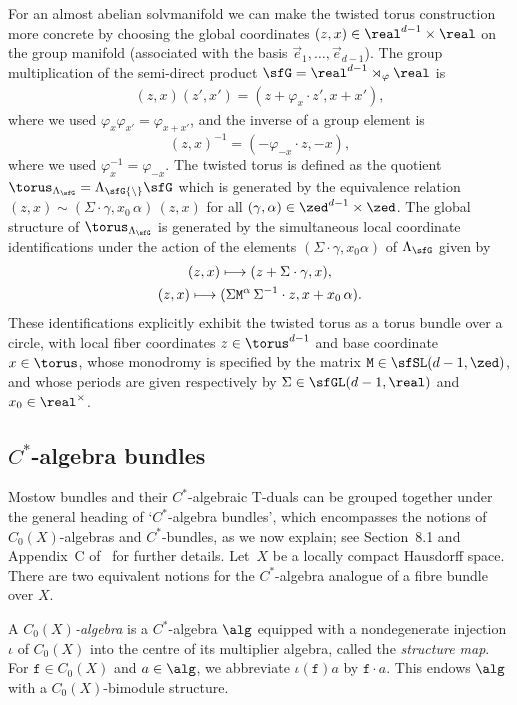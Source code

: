 For an almost abelian solvmanifold we can make the twisted torus construction more concrete
by choosing the global
coordinates $(z,x)\in\real^{d-1}\times\real$ on the group
manifold (associated with the basis $\vec e_1,\ldots,\vec e_{d-1}$).
The group multiplication of the semi-direct product
$\sfG=\real^{d-1}\rtimes_\varphi\real$ is
\begin{gather}\label{eq:grouplaw}
(z,x) (z',x') = (z + \varphi_x\cdot z',x+x') ,
\end{gather}
where we used $\varphi_x \varphi_{x'} = \varphi_{x+x'}$, and the
inverse of a group element is
\[
(z,x)^{-1} = (-\varphi_{-x}\cdot z,-x) ,
\]
where we used $\varphi_x^{-1}=\varphi_{-x}$.
The twisted torus is defined as the quotient $\torus_{\Lambda_\sfG}=\Lambda_\sfG
{\setminus} \sfG$ which is generated by the equivalence relation $(z,x)\sim
(\Sigma\cdot\gamma,x_0\,\alpha)\,(z,x)$ for all $(\gamma,\alpha)\in\zed^{d-1}\times\zed$. The global structure
of $\torus_{\Lambda_{\sfG}}$ is generated by the simultaneous local coordinate
identifications under the action of the elements
$(\Sigma\cdot\gamma,x_0 \alpha) $ of $\Lambda_\sfG$ given by
\begin{gather}
(z,x) \longmapsto (
 z+\Sigma\cdot\gamma,x) , \nonumber \\
(z,x) \longmapsto (
\Sigma {\tt M}^\alpha\,\Sigma^{-1}\cdot z,x+x_0\,\alpha) .\label{eq:Mostowtorus}
\end{gather}
These identifications explicitly exhibit the twisted torus as a torus bundle over a circle, with
local fiber coordinates $z\in \torus^{d-1}$ and base coordinate $x\in \torus$,
 whose monodromy is specified by the matrix ${\tt M}\in
 \sfSL(d-1,\zed)$, and whose periods are given respectively by
 $\Sigma\in\sfGL(d-1,\real)$ and $x_0\in\real^\times$.

\subsection{$C^*$-algebra bundles}\label{sec:C*bundles}

Mostow bundles and their $C^*$-algebraic T-duals can be grouped together
under the general heading of `$C^*$-algebra bundles', which encompasses
the notions of $C_0(X)$-algebras and $C^*$-bundles, as we now
explain; see Section~8.1 and Appendix~C of~\cite{Williams2007} for
further details.
Let~$X$ be a locally compact Hausdorff space. There are two equivalent
notions for the $C^*$-algebra analogue of a fibre bundle over $X$.

A \emph{$C_0(X)$-algebra} is a $C^*$-algebra $\alg$
equipped with a nondegenerate injection $\iota$ of $C_0(X)$
into the centre of its multiplier algebra, called the \emph{structure
 map}. For $\mathtt{f}\in C_0(X)$ and
$a\in\alg$, we abbreviate $\iota(\mathtt{f})a$ by $\mathtt{f}\cdot a$. This endows
$\alg$ with a $C_0(X)$-bimodule
structure.

